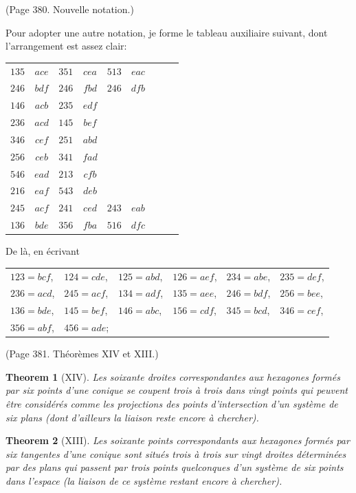 \documentclass[11pt,a4paper]{book}
\newtheorem*{theorem}{Theorem}
\begin{document}
(Page 380. Nouvelle notation.)

Pour adopter une autre notation, je forme le tableau auxiliaire suivant,
dont l'arrangement est assez clair:
\begin{center}
\begin{tabular}{ccc|ccc|ccc}
$135$ & $ace$ & $351$ & $cea$ & $513$ & $eac$ \\
$246$ & $bdf$ & $246$ & $fbd$ & $246$ & $dfb$ \\

$146$ & $acb$ & $235$ & $edf$ && \\
$236$ & $acd$ & $145$ & $bef$ && \\
$346$ & $cef$ & $251$ & $abd$ && \\
$256$ & $ceb$ & $341$ & $fad$ && \\
$546$ & $ead$ & $213$ & $cfb$ && \\
$216$ & $eaf$ & $543$ & $deb$ && \\
$245$ & $acf$ & $241$ & $ced$ & $243$ & $eab$ \\
$136$ & $bde$ & $356$ & $fba$ & $516$ & $dfc$
\end{tabular}
\end{center}

De l\`{a}, en \'{e}crivant
\begin{center}
\begin{tabular}{llllll}
$123 = bcf$, & $124 = cde$, & $125 = abd$, & $126 = aef$, & $234 = abe$, & $235 = def$, \\
$236 = acd$, & $245 = acf$, & $134 = adf$, & $135 = aee$, & $246 = bdf$, & $256 = bee$, \\
$136 = bde$, & $145 = bef$, & $146 = abc$, & $156 = cdf$, & $345 = bcd$, & $346 = cef$, \\
$356 = abf$, & $456 = ade$;
\end{tabular}
\end{center}

(Page 381. Th\'{e}or\`{e}mes XIV et XIII.)

\begin{theorem}[XIV]
Les soixante droites correspondantes aux hexagones form\'{e}s par six points
d'une conique se coupent trois \`{a} trois dans vingt points qui peuvent \^{e}tre
consid\'{e}r\'{e}s comme les projections des points d'intersection d'un syst\`{e}me de six plans
(dont d'ailleurs la liaison reste encore \`{a} chercher).
\end{theorem}

\begin{theorem}[XIII]
Les soixante points correspondants aux hexagones form\'{e}s par six tangentes
d'une conique sont situ\'{e}s trois \`{a} trois sur vingt droites d\'{e}termin\'{e}es par des plans
qui passent par trois points quelconques d'un syst\`{e}me de six points dans l'espace
(la liaison de ce syst\`{e}me restant encore \`{a} chercher).
\end{theorem}
\end{document}
